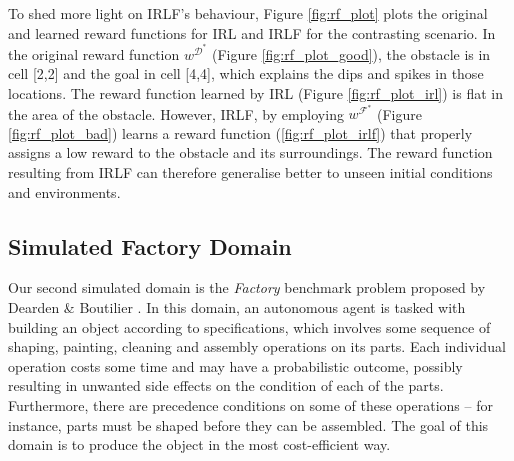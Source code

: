 \documentclass{aamas2016}
\newcommand{\jm}[1]{\textcolor{blue}{Joao: #1}}
\newcommand{\jm}[1]{}
\begin{document}
To shed more light on IRLF's behaviour, Figure \ref{fig:rf_plot} plots the original and learned reward functions for IRL and IRLF for the contrasting scenario. In the original reward function $w^{\mathcal{D}^*}$ (Figure \ref{fig:rf_plot_good}), the obstacle is in cell [2,2] and the goal in cell [4,4], which explains the dips and spikes in those locations.  The reward function learned by IRL (Figure \ref{fig:rf_plot_irl}) is flat in the area of the obstacle. However, IRLF, by employing $w^{\mathcal{F}^*}$ (Figure \ref{fig:rf_plot_bad}) learns a reward function (\ref{fig:rf_plot_irlf}) that properly assigns a low reward to the obstacle and its surroundings. The reward function resulting from IRLF can therefore generalise better to unseen initial conditions and environments.



\subsection{Simulated Factory Domain}
Our second simulated domain is the \emph{Factory} benchmark problem proposed by Dearden \& Boutilier \cite{dearden1997abstraction}. In this domain, an autonomous agent is tasked with building an object according to specifications, which involves some sequence of shaping, painting, cleaning and assembly operations on its parts. Each individual operation costs some time and may have a probabilistic outcome, possibly resulting in unwanted side effects on the condition of each of the parts. Furthermore, there are precedence conditions on some of these operations -- for instance, parts must be shaped before they can be assembled. The goal of this domain is to produce the object in the most cost-efficient way.
\end{document}
